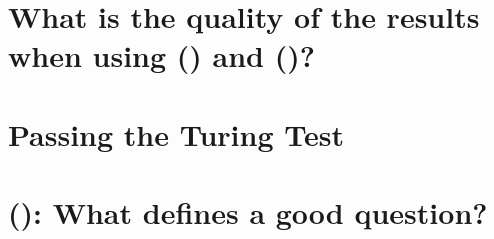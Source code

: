 \section{What is the quality of the results when using  () and  ()?}
\label{chapter3:quality_results_hmm_bn}


\section{Passing the Turing Test}
\label{chapter3:turing_test}


\section{ (): What defines a good question?}
\label{chapter3:define_good_question}

